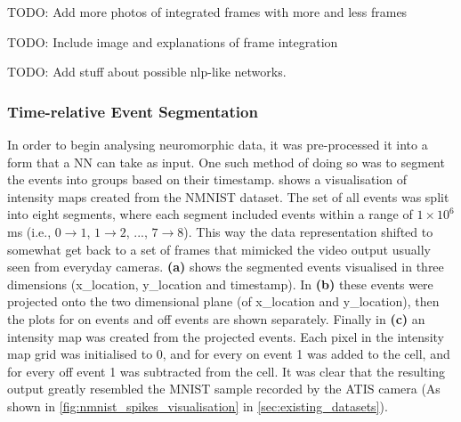 \color{red} TODO: Add more photos of integrated frames with more and less frames \color{black}

\color{red} TODO: Include image and explanations of frame integration \color{black}

\color{red} TODO: Add stuff about possible nlp-like networks. \color{black}

\subsubsection{Time-relative Event Segmentation}
In order to begin analysing neuromorphic data, it was pre-processed it into a form that a NN can take as input. One such method of doing so was to segment the events into groups based on their timestamp.  shows a visualisation of intensity maps created from the NMNIST\cite{NMNIST} dataset. The set of all events was split into eight segments, where each segment included events within a range of $ 1 \times 10^6 $ ms (i.e., $ 0 \rightarrow 1 $, $ 1 \rightarrow 2 $, ..., $ 7 \rightarrow 8 $). This way the data representation shifted to somewhat get back to a set of frames that mimicked the video output usually seen from everyday cameras. \textbf{(a)} shows the segmented events visualised in three dimensions (x\_location, y\_location and timestamp). In \textbf{(b)} these events were projected onto the two dimensional plane (of x\_location and y\_location), then the plots for on events and off events are shown separately. Finally in \textbf{(c)} an intensity map was created from the projected events. Each pixel in the intensity map grid was initialised to 0, and for every on event 1 was added to the cell, and for every off event 1 was subtracted from the cell. It was clear that the resulting output greatly resembled the MNIST\cite{MNIST} sample recorded by the ATIS camera (As shown in \cref{fig:nmnist_spikes_visualisation} in \cref{sec:existing_datasets}).

